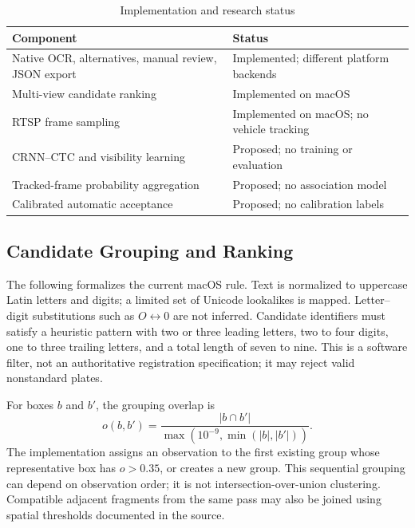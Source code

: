 \documentclass[journal]{IEEEtran}
\begin{document}
\begin{table}[t]
\caption{Implementation and research status}
\label{tab:status}
\centering\footnotesize
\setlength{\tabcolsep}{8pt}
\renewcommand{\arraystretch}{1.15}
\begin{tabular}{@{}>{\raggedright\arraybackslash}p{}>{\raggedright\arraybackslash}p{}@{}}
\toprule
Component & Status \\
\midrule
Native OCR, alternatives, manual review, JSON export & Implemented; different platform backends \\
Multi-view candidate ranking & Implemented on macOS \\
RTSP frame sampling & Implemented on macOS; no vehicle tracking \\
CRNN--CTC and visibility learning & Proposed; no training or evaluation \\
Tracked-frame probability aggregation & Proposed; no association model \\
Calibrated automatic acceptance & Proposed; no calibration labels \\
\bottomrule
\end{tabular}
\end{table}

\subsection{Candidate Grouping and Ranking}
The following formalizes the current macOS rule. Text is normalized to uppercase Latin letters and digits; a limited set of Unicode lookalikes is mapped. Letter--digit substitutions such as $O\leftrightarrow0$ are not inferred. Candidate identifiers must satisfy a heuristic pattern with two or three leading letters, two to four digits, one to three trailing letters, and a total length of seven to nine. This is a software filter, not an authoritative registration specification; it may reject valid nonstandard plates.

For boxes $b$ and $b'$, the grouping overlap is
\begin{equation}\label{eq:overlap}
 o(b,b')=\frac{|b\cap b'|}{\max(10^{-9},\min(|b|,|b'|))}.
\end{equation}
The implementation assigns an observation to the first existing group whose representative box has $o>0.35$, or creates a new group. This sequential grouping can depend on observation order; it is not intersection-over-union clustering. Compatible adjacent fragments from the same pass may also be joined using spatial thresholds documented in the source.
\end{document}
